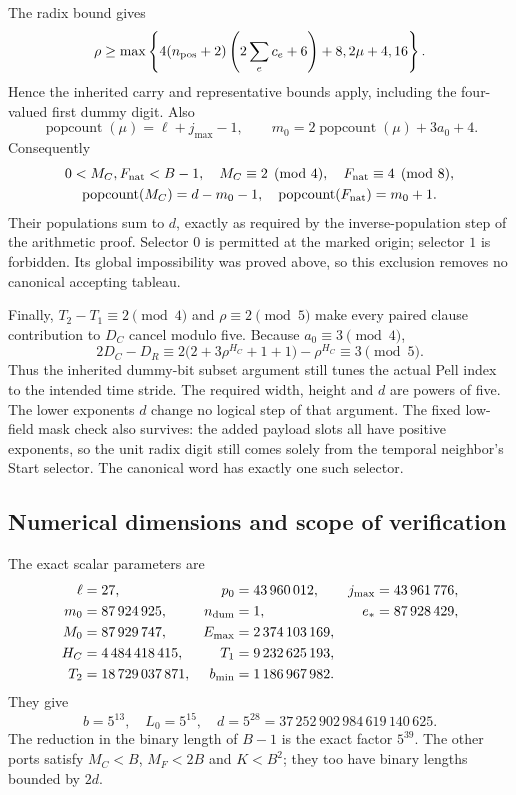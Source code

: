 The radix bound gives
\[
 \rho\ge\max\left\{
  4(n_{\rm pos}+2)\left(2\sum_e c_e+6\right)+8,
  2\mu+4,16\right\}.
\]
Hence the inherited carry and representative bounds apply, including the
four-valued first dummy digit.  Also
\[
 \operatorname{popcount}(\mu)=\ell+j_{\max}-1,
 \qquad m_0=2\operatorname{popcount}(\mu)+3a_0+4.
\]
Consequently
\begin{gather*}
 0<M_C,F_{\rm nat}<B-1,\quad
 M_C\equiv2\pmod4,\quad F_{\rm nat}\equiv4\pmod8,\\
 \operatorname{popcount}(M_C)=d-m_0-1,\quad
 \operatorname{popcount}(F_{\rm nat})=m_0+1.
\end{gather*}
Their populations sum to $d$, exactly as required by the inverse-population
step of the arithmetic proof.  Selector $0$ is permitted at the marked
origin; selector $1$ is forbidden.  Its global impossibility was proved
above, so this exclusion removes no canonical accepting tableau.

Finally, $T_2-T_1\equiv2\pmod4$ and $\rho\equiv2\pmod5$ make every paired
clause contribution to $D_C$ cancel modulo five.  Because
$a_0\equiv3\pmod4$,
\[
 2D_C-D_R
 \equiv2\bigl(2+3\rho^{H_C}+1+1\bigr)-\rho^{H_C}
 \equiv3\pmod5.
\]
Thus the inherited dummy-bit subset argument still tunes the actual Pell
index to the intended time stride.  The required width, height and $d$
are powers of five.  The lower exponents $d$ change no logical step of
that argument.  The fixed low-field mask check also survives: the added
payload slots all have positive exponents, so the unit radix digit still
comes solely from the temporal neighbor's Start selector.  The canonical
word has exactly one such selector.

\subsection{Numerical dimensions and scope of verification}

The exact scalar parameters are
\begin{align*}
 \ell&=27,& p_0&=43\,960\,012,&j_{\max}&=43\,961\,776,\\
 m_0&=87\,924\,925,&n_{\rm dum}&=1,&e_*&=87\,928\,429,\\
 M_0&=87\,929\,747,&E_{\max}&=2\,374\,103\,169,\\
 H_C&=4\,484\,418\,415,&T_1&=9\,232\,625\,193,\\
 T_2&=18\,729\,037\,871,&b_{\min}&=1\,186\,967\,982.
\end{align*}
They give
\[
 b=5^{13},\quad L_0=5^{15},\quad d=5^{28}
       =37\,252\,902\,984\,619\,140\,625.
\]
The reduction in the binary length of $B-1$ is the exact factor $5^{39}$.
The other ports satisfy $M_C<B$, $M_F<2B$ and $K<B^2$; they too have
binary lengths bounded by $2d$.

